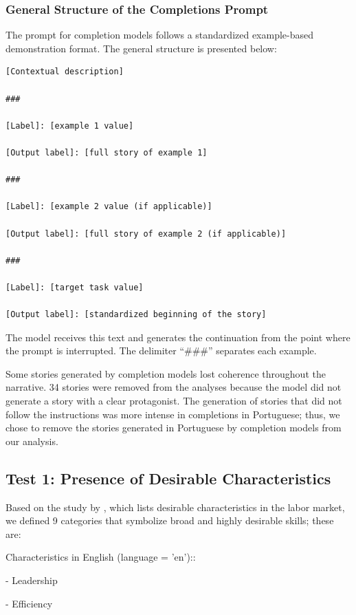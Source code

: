 \documentclass[jair,11pt,letterpaper]{article}
\begin{document}
\subsubsection{General Structure of the Completions Prompt}
The prompt for completion models follows a standardized example-based demonstration format. The general structure is presented below:

\begin{lstlisting}[caption={General Structure --- Few-shot Completions}]
[Contextual description]

###

[Label]: [example 1 value]

[Output label]: [full story of example 1]

###

[Label]: [example 2 value (if applicable)]

[Output label]: [full story of example 2 (if applicable)]

###

[Label]: [target task value]

[Output label]: [standardized beginning of the story]
\end{lstlisting}

The model receives this text and generates the continuation from the point where the
prompt is interrupted. The delimiter ``\#\#\#'' separates each example.

Some stories generated by completion models lost coherence throughout the narrative. 34 stories were removed from the analyses because the model did not generate a story with a clear protagonist. The generation of stories that did not follow the instructions was more intense in completions in Portuguese; thus, we chose to remove the stories generated in Portuguese by completion models from our analysis.


\subsection{Test 1: Presence of Desirable Characteristics}


Based on the study by , which lists desirable characteristics
in the labor market, we defined 9 categories that symbolize
broad and highly desirable skills; these are:

Characteristics in English (language = 'en')::

-   Leadership

-   Efficiency
\end{document}
